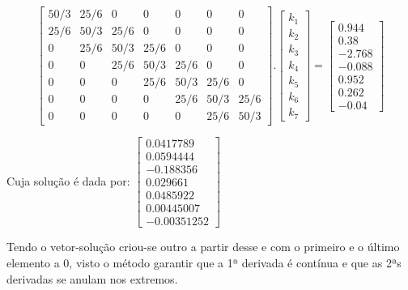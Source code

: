 \documentclass{article}
\begin{document}
\begin{multicols}{2}
\[
  \begin{bmatrix}
    50/3  & 25/6 &  0  &  0 &  0 & 0 & 0\\ 
    25/6 & 50/3  & 25/6 &  0 &  0& 0 & 0\\ 
    0   & 25/6 &  50/3 & 25/6 &  0& 0 & 0\\ 
    0   &  0  & 25/6  & 50/3 & 25/6& 0 & 0\\ 
    0   &  0  &  0  & 25/6 &  50/3& 25/6 & 0\\
    0 & 0  & 0 &  0 &  25/6& 50/3 & 25/6\\ 
    0   & 0 &  0 & 0 &  0& 25/6 & 50/3
  \end{bmatrix}
  .
  \begin{bmatrix}
    k_{1}\\
    k_{2}\\
    k_{3}\\
    k_{4}\\
    k_{5}\\
    k_{6}\\
    k_{7} 
  \end{bmatrix}
  =
  \begin{bmatrix}
    0.944\\
    0.38\\
    -2.768\\
    -0.088 \\
    0.952 \\
    0.262\\
    -0.04
  \end{bmatrix}
  \]

  Cuja solução é dada por:
$
  \begin{bmatrix}
    0.0417789\\
     0.0594444\\
      -0.188356\\
       0.029661\\
        0.0485922\\
        0.00445007\\
        -0.00351252
  \end{bmatrix}  
  $
  
  
  
  Tendo o vetor-solução criou-se outro a partir desse e com o primeiro e o último elemento a 0, visto o método garantir que a 1ª derivada é contínua e que as 2ªs derivadas se anulam nos extremos. 


\end{multicols}
\end{document}
